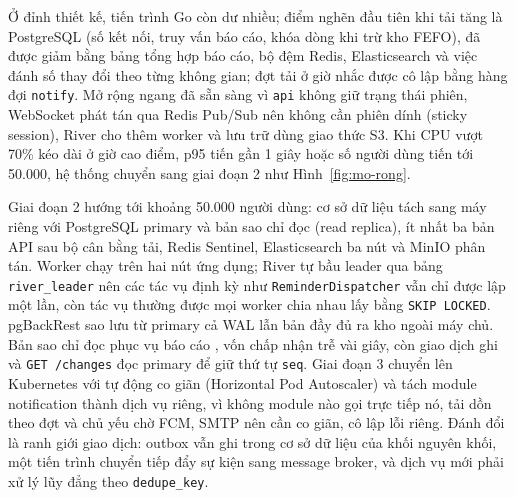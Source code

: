 Ở đỉnh thiết kế, tiến trình Go còn dư nhiều; điểm nghẽn đầu tiên khi tải tăng là PostgreSQL (số kết nối, truy vấn báo cáo, khóa dòng khi trừ kho FEFO), đã được giảm bằng bảng tổng hợp báo cáo, bộ đệm Redis, Elasticsearch và việc đánh số thay đổi theo từng không gian; đợt tải ở giờ nhắc được cô lập bằng hàng đợi \texttt{notify}. Mở rộng ngang đã sẵn sàng vì \texttt{api} không giữ trạng thái phiên, WebSocket phát tán qua Redis Pub/Sub nên không cần phiên dính (sticky session), River cho thêm worker và lưu trữ dùng giao thức S3. Khi CPU vượt 70\% kéo dài ở giờ cao điểm, p95 tiến gần 1 giây hoặc số người dùng tiến tới 50.000, hệ thống chuyển sang giai đoạn 2 như Hình~\ref{fig:mo-rong}.


Giai đoạn 2 hướng tới khoảng 50.000 người dùng: cơ sở dữ liệu tách sang máy riêng với PostgreSQL primary và bản sao chỉ đọc (read replica), ít nhất ba bản API sau bộ cân bằng tải, Redis Sentinel, Elasticsearch ba nút và MinIO phân tán. Worker chạy trên hai nút ứng dụng; River tự bầu leader qua bảng \texttt{river\_leader} nên các tác vụ định kỳ như \texttt{ReminderDispatcher} vẫn chỉ được lập một lần, còn tác vụ thường được mọi worker chia nhau lấy bằng \texttt{SKIP LOCKED}. pgBackRest sao lưu từ primary cả WAL lẫn bản đầy đủ ra kho ngoài máy chủ. Bản sao chỉ đọc phục vụ báo cáo ,  vốn chấp nhận trễ vài giây, còn giao dịch ghi và \texttt{GET /changes} đọc primary để giữ thứ tự \texttt{seq}. Giai đoạn 3 chuyển lên Kubernetes với tự động co giãn (Horizontal Pod Autoscaler) và tách module notification thành dịch vụ riêng, vì không module nào gọi trực tiếp nó, tải dồn theo đợt và chủ yếu chờ FCM, SMTP nên cần co giãn, cô lập lỗi riêng. Đánh đổi là ranh giới giao dịch: outbox vẫn ghi trong cơ sở dữ liệu của khối nguyên khối, một tiến trình chuyển tiếp đẩy sự kiện sang message broker, và dịch vụ mới phải xử lý lũy đẳng theo \texttt{dedupe\_key}.
